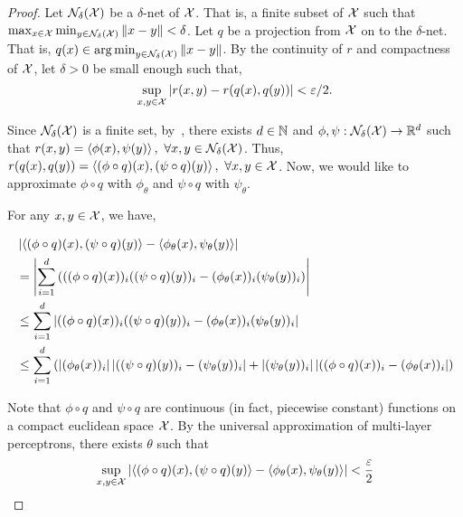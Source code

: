 \begin{proof}
    \hphantom{~}

    Let ${\mathcal{N}}_\delta({\mathcal{X}})$ be a $\delta$-net of ${\mathcal{X}}$. That is, a finite subset of ${\mathcal{X}}$ such that $\max_{x \in {\mathcal{X}}} \min_{y \in {\mathcal{N}}_\delta({\mathcal{X}})} \left\lVert x - y\right\rVert < \delta$. Let $q$ be a projection from ${\mathcal{X}}$ on to the $\delta$-net. That is, $q(x) \in \operatorname*{arg\,min}_{y \in {\mathcal{N}}_\delta({\mathcal{X}})} \left\lVert x - y\right\rVert$. By the continuity of $r$ and compactness of ${\mathcal{X}}$, let $\delta > 0$ be small enough such that,
    \begin{equation*}
        \sup_{x, y \in {\mathcal{X}}} \left\lvert r(x,y) - r(q(x), q(y))\right\rvert < \varepsilon / 2.
    \end{equation*}

    Since ${\mathcal{N}}_\delta({\mathcal{X}})$ is a finite set, by~, there exists $d \in {\mathbb{N}}$ and $\phi, \psi: {\mathcal{N}}_\delta({\mathcal{X}}) \to \mathbb{R}^d$ such that $r(x, y) = \left \langle \phi(x), \psi(y) \right\rangle, \ \forall x,y \in {\mathcal{N}}_\delta({\mathcal{X}})$. Thus, $r(q(x), q(y)) = \left \langle (\phi \circ q)(x), (\psi \circ q)(y) \right\rangle, \ \forall x,y \in {\mathcal{X}}$.  Now, we would like to approximate $\phi \circ q$ with $\phi_\theta$ and $\psi \circ q$ with $\psi_\theta$.

    For any $x, y \in {\mathcal{X}}$, we have,

    \begin{equation*}
        \begin{split}
            &\left\lvert\left \langle (\phi \circ q)(x), (\psi \circ q)(y) \right\rangle - \left \langle \phi_\theta(x), \psi_\theta(y) \right\rangle\right\rvert \\
            &= \left\lvert\sum_{i=1}^{d} \left(((\phi \circ q)(x))_i ((\psi \circ q)(y))_i - (\phi_\theta(x))_i (\psi_\theta(y))_i\right)\right\rvert \\
            &\leq \sum_{i=1}^{d} \left\lvert((\phi \circ q)(x))_i ((\psi \circ q)(y))_i - (\phi_\theta(x))_i (\psi_\theta(y))_i\right\rvert \\
        &\leq \sum_{i=1}^d \left( \left\lvert(\phi_\theta(x))_i\right\rvert \left\lvert((\psi \circ q)(y))_i - (\psi_\theta(y))_i\right\rvert + \left\lvert(\psi_\theta(y))_i\right\rvert \left\lvert((\phi \circ q)(x))_i - (\phi_\theta(x))_i\right\rvert\right) \\
    \end{split}
\end{equation*}

Note that $\phi \circ q$ and $\psi \circ q$ are continuous (in fact, piecewise constant) functions on a compact euclidean space ${\mathcal{X}}$. By the universal approximation of multi-layer perceptrons, there exists $\theta$ such that
\begin{equation*}
    \sup_{x, y \in {\mathcal{X}}} \left\lvert\left \langle (\phi \circ q)(x), (\psi \circ q)(y) \right\rangle - \left \langle \phi_\theta(x), \psi_\theta(y) \right\rangle\right\rvert < \frac{\varepsilon}{2}
\end{equation*}


\end{proof}
